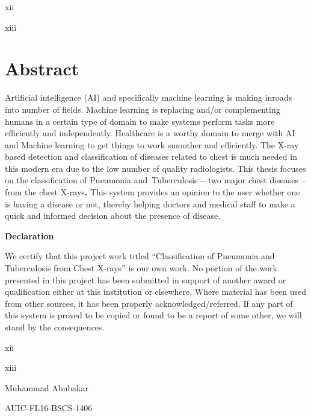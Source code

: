 \documentclass{article} %
\begin{document}
\noindent xii

\noindent xiii

\noindent 

\noindent 

\noindent \eject 

\noindent 

\noindent 
\section{Abstract}

\noindent Artificial intelligence (AI) and specifically machine learning is making inroads into number of fields. Machine learning is replacing and/or complementing humans in a certain type of domain to make systems perform tasks more efficiently and independently. Healthcare is a worthy domain to merge with AI and Machine learning to get things to work smoother and efficiently. The X-ray based detection and classification of diseases related to chest is much needed in this modern era due to the low number of quality radiologists. This thesis focuses on the classification of Pneumonia and~Tuberculosis\textbf{ -- }two major chest diseases -- from the chest X-rays\textbf{.} This system provides an opinion to the user whether one is having a disease or not, thereby helping doctors and medical staff to make a quick and informed decision about the presence of disease.\eject 

\noindent 

\noindent \textbf{Declaration}

\noindent We certify that this project work titled ``Classification of Pneumonia and Tuberculosis from Chest X-rays'' is our own work. No portion of the work presented in this project has been submitted in support of another award or qualification either at this institution or elsewhere. Where material has been used from other sources, it has been properly acknowledged/referred. If any part of this system is proved to be copied or found to be a report of some other, we will stand by the consequences.

\noindent 

\noindent xii

\noindent xiii

\noindent 

\noindent 

\noindent 

\noindent Muhammad Abubakar

\noindent AUIC-FL16-BSCS-1406
\end{document}
